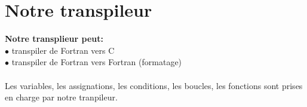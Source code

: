 \section{Notre transpileur}

\begin{frame}
    \textbf{Notre transplieur peut:}\\
    $\bullet$ transpiler de Fortran vers C\\
    $\bullet$ transpiler de Fortran vers Fortran (formatage)\\
    \vspace{0.5cm} {
        \\
        Les variables, les assignations, les conditions, les boucles, les fonctions sont prises en charge par notre tranpileur. 
    }   

\end{frame}


\begin{frame}
\noindent
\begin{minipage}[t]{0.48\textwidth}
    
\end{minipage}
\hfill
\begin{minipage}[t]{0.48\textwidth}
\end{minipage}

\end{frame}

